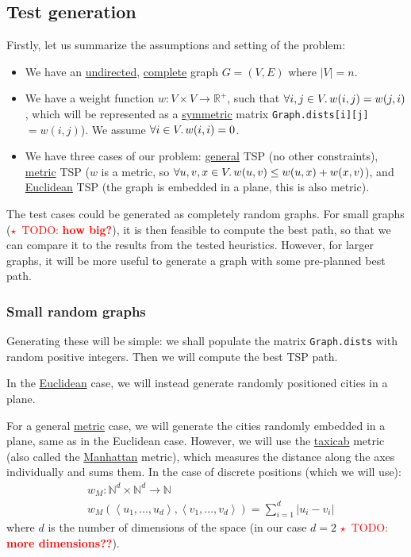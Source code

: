 \documentclass{article}
\newcommand{\todo}[1]{\textcolor{red}{$\star$~TODO: \textbf{#1}}}
\newcommand{\R}{\mathbb{R}}
\newcommand{\uu}[1]{\underline{#1}}
\newcommand{\py}[1]{\lstinline[language=Python]{#1}}
\begin{document}
\subsection{Test generation}

Firstly, let us summarize the assumptions and setting of the problem:
\begin{itemize}
\item We have an \uu{undirected}, \uu{complete} graph $G=(V,E)$ where $|V|=n$.
\item We have a weight function $w:V\times V\to\R^{+}$, such that
  $\forall i,j\in V \ldotp w(i,j) = w(j,i)$, which will be represented as
  a \uu{symmetric} matrix \py{Graph.dists[i][j]}\,$= w(i,j)$).
  We assume $\forall i\in V\ldotp w(i,i)=0$.
\item We have three cases of our problem: \uu{general} TSP
  (no other constraints), \uu{metric} TSP ($w$ is a metric, so
  $\forall u,v,x\in V\ldotp w(u,v)\le w(u,x) + w(x,v)$), and
  \uu{Euclidean} TSP (the graph is embedded in a plane, this is also metric).
\end{itemize}

The test cases could be generated as completely random graphs. For small graphs
(\todo{how big?}), it is then feasible to compute the best path, so that we can
compare it to the results from the tested heuristics. However, for larger graphs,
it will be more useful to generate a graph with some pre-planned best path.

\subsubsection{Small random graphs}

Generating these will be simple: we shall populate the matrix
\py{Graph.dists} with random positive integers. Then we will
compute the best TSP path.

In the \uu{Euclidean} case, we will instead generate randomly positioned
cities in a plane.

For a general \uu{metric} case, we will generate the cities randomly embedded
in a plane, same as in the Euclidean case. However, we will use
the \uu{taxicab} metric (also called the \uu{Manhattan} metric), which measures
the distance along the axes individually and sums them. In the case of discrete
positions (which we will use):
\begin{align*}
  & w_M: \mathbb{N}^d \times \mathbb{N}^d \to \mathbb{N} \\
  & w_M\left(\left<u_1,...,u_d\right>, \left<v_1,...,v_d\right>\right) = \sum_{i=1}^d \left|u_i - v_i\right|
\end{align*}
where $d$ is the number of dimensions of the space (in our case $d=2$
\todo{more dimensions??}).
\end{document}

